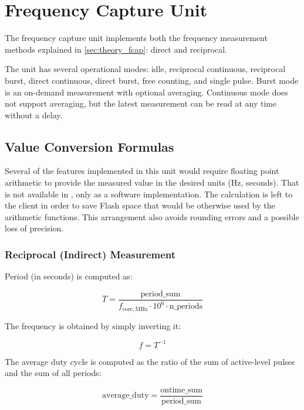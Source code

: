 
\section{Frequency Capture Unit}

The frequency capture unit implements both the frequency measurement methods explained in \cref{sec:theory_fcap}: direct and reciprocal.

The unit has several operational modes: idle, reciprocal continuous, reciprocal burst, direct continuous, direct burst, free counting, and single pulse. Burst mode is an on-demand measurement with optional averaging. Continuous mode does not support averaging, but the latest measurement can be read at any time without a delay.

\subsection{Value Conversion Formulas}

Several of the features implemented in this unit would require floating point arithmetic to provide the measured value in the desired units (Hz, seconds). That is not available in \armcm, only as a software implementation. The calculation is left to the client in order to save Flash space that would be otherwise used by the arithmetic functions. This arrangement also avoids rounding errors and a possible loss of precision.

\subsubsection{Reciprocal (Indirect) Measurement}

Period (in seconds) is computed as:

\begin{equation}
	T = \dfrac{\mathrm{period\_sum}}{f_\mathrm{core,MHz} \cdot 10^6 \cdot \mathrm{n\_periods}}
\end{equation}

\noindent
The frequency is obtained by simply inverting it:

\begin{equation}
f=T^{-1}
\end{equation}

The average duty cycle is computed as the ratio of the sum of active-level pulses and the sum of all periods:

\begin{equation}
\mathrm{average\_duty} = \dfrac{\mathrm{ontime\_sum}}{\mathrm{period\_sum}}
\end{equation}

